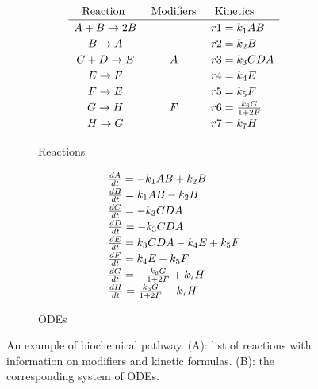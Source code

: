 \begin{figure}
\begin{subfigure}[b]{0.49\linewidth}
    \[\def\arraystretch{1.2}
    \begin{array}{ccl}
      \mbox{Reaction } & \mbox{ Modifiers } & \mbox{ Kinetics}\\
      \hline
      A + B \rightarrow 2B &      & r1 = k_1AB\\
      B \rightarrow A      &      & r2 = k_2B\\
      C + D \rightarrow E  & A    & r3 = k_3CDA\\
      E \rightarrow F      &      & r4 = k_4E\\
      F \rightarrow E      &      & r5 = k_5F\\
      G \rightarrow H      & F    & r6 = \frac{k_6G}{1+2 F}\\
      H \rightarrow G      &      & r7 = k_7H\\
    \end{array}
    \]
\caption{Reactions}\label{subfig:example-reactions}
\end{subfigure}
%
\begin{subfigure}[b]{0.49\linewidth}
\[\def\arraystretch{1.2}
\begin{array}{l}
    \frac{dA}{dt} = -k_1AB + k_2B\\
    \frac{dB}{dt} = k_1AB - k_2B\\
    \frac{dC}{dt} = -k_3CDA\\
    \frac{dD}{dt} = -k_3CDA\\
    \frac{dE}{dt} = k_3CDA - k_4E + k_5F\\
    \frac{dF}{dt} = k_4E - k_5F\\
    \frac{dG}{dt} = -\frac{k_6G}{1+2 F} + k_7H\\
    \frac{dH}{dt} = \frac{k_6G}{1+2 F} - k_7H
\end{array}
\]
\caption{ODEs}\label{subfig:example-odes}
\end{subfigure}
%
\caption{An example of biochemical pathway. (A): list of reactions with information on modifiers and kinetic formulas. (B): the corresponding system of ODEs.}\label{fig:example-pathway}
\end{figure}